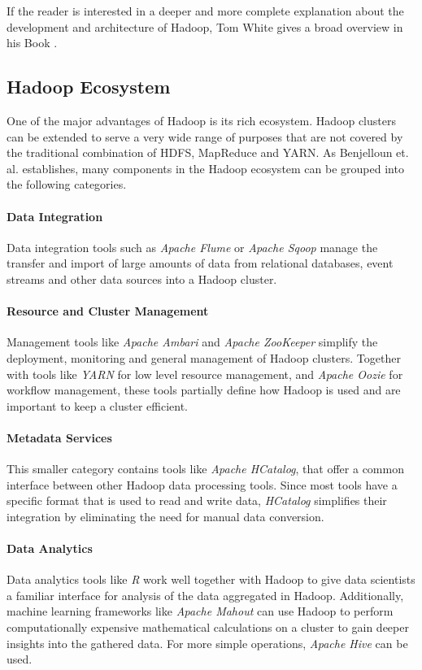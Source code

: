 If the reader is interested in a deeper and more complete explanation about the development and architecture of Hadoop, Tom White gives a broad overview in his Book \autocite[][]{white2015hadoop}.


\subsection{Hadoop Ecosystem}

One of the major advantages of Hadoop is its rich ecosystem. 
Hadoop clusters can be extended to serve a very wide range of purposes 
that are not covered by the traditional combination of \ac{HDFS}, MapReduce and \ac{YARN}.
As Benjelloun et. al. establishes, many components in the Hadoop ecosystem 
can be grouped into the following categories.\autocite{7105553}

\paragraph{Data Integration}
Data integration tools such as \emph{Apache Flume} or \emph{Apache Sqoop} manage the transfer 
and import of large amounts of data from relational databases\autocite{apache2018sqoop}, 
event streams and other data sources\autocite{apache2017flume} into a Hadoop cluster.

\paragraph{Resource and Cluster Management}
Management tools like \emph{Apache Ambari} and \emph{Apache ZooKeeper} simplify the deployment, 
monitoring and general management of Hadoop clusters. 
Together with tools like \emph{\ac{YARN}} for low level resource management, 
and \emph{Apache Oozie} for workflow management, these tools partially define how Hadoop is used 
and are important to keep a cluster efficient.

\paragraph{Metadata Services}
This smaller category contains tools like \emph{Apache HCatalog}, 
that offer a common interface between other Hadoop data processing tools. 
Since most tools have a specific format that is used to read and write data, 
\emph{HCatalog} simplifies their integration by eliminating 
the need for manual data conversion.\autocite{bmc2017hcatalog}

\paragraph{Data Analytics}
Data analytics tools like \emph{R} work well together with Hadoop to give data scientists 
a familiar interface for analysis of the data aggregated in Hadoop. 
Additionally, machine learning frameworks like \emph{Apache Mahout} can use Hadoop 
to perform computationally expensive mathematical calculations 
on a cluster to gain deeper insights into the gathered data. 
For more simple operations, \emph{Apache Hive} can be used.

